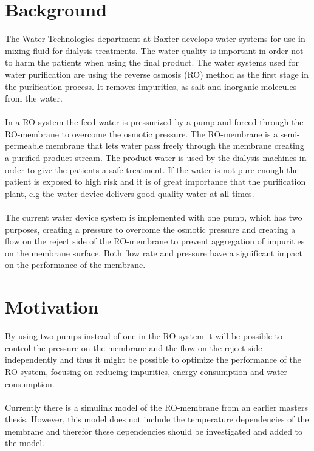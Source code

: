 
\section{Background}

The Water Technologies department at Baxter develops water systems for use in mixing fluid for dialysis treatments. The water quality is important in order not to harm the patients when using the final product. The water systems used for water purification are using the reverse osmosis (RO) method as the first stage in the purification process. It removes impurities, as salt and inorganic molecules from the water\cite{1}.\\
\\
In a RO-system the feed water is pressurized by a pump and forced through the RO-membrane to overcome the osmotic pressure. The RO-membrane is a semi-permeable membrane that lets water pass freely through the membrane creating a purified product stream. The product water is used by the dialysis machines in order to give the patients a safe treatment. If the water is not pure enough the patient is exposed to high risk and it is of great importance that the purification plant, e.g the water device delivers good quality water at all times.\\
\\
The current water device system is implemented with one pump, which has two purposes, creating a pressure to overcome the osmotic pressure and creating a flow on the reject side of the RO-membrane to prevent aggregation of impurities on the membrane surface. Both flow rate and pressure have a significant impact on the performance of the membrane.\\


\section{Motivation}
By using two pumps instead of one in the RO-system it will be possible to control the pressure on the membrane and the flow on the reject side independently and thus it might be possible to optimize the performance of the RO-system, focusing on reducing impurities, energy consumption and water consumption. \\
\\
Currently there is a simulink model of the RO-membrane from an earlier masters thesis. However, this model does not include the temperature dependencies of the membrane and therefor these dependencies should be investigated and added to the model. 
